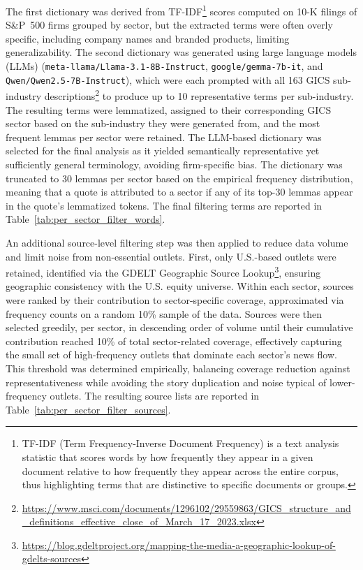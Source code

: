 The first dictionary was derived from TF-IDF\footnote{TF-IDF (Term Frequency-Inverse Document Frequency) is a text analysis statistic that scores words by how frequently they appear in a given document relative to how frequently they appear across the entire corpus, thus highlighting terms that are distinctive to specific documents or groups.} scores computed on 10-K filings of S\&P~500 firms grouped by sector, but the extracted terms were often overly specific, including company names and branded products, limiting generalizability. The second dictionary was generated using large language models (LLMs) (\texttt{meta-llama/Llama-3.1-8B-Instruct}, \texttt{google/gemma-7b-it}, and \texttt{Qwen/Qwen2.5-7B-Instruct}), which were each prompted with all 163 GICS sub-industry descriptions\footnote{\url{https://www.msci.com/documents/1296102/29559863/GICS_structure_and_definitions_effective_close_of_March_17_2023.xlsx}} to produce up to 10 representative terms per sub-industry. The resulting terms were lemmatized, assigned to their corresponding GICS sector based on the sub-industry they were generated from, and the most frequent lemmas per sector were retained. The LLM-based dictionary was selected for the final analysis as it yielded semantically representative yet sufficiently general terminology, avoiding firm-specific bias. The dictionary was truncated to 30 lemmas per sector based on the empirical frequency distribution, meaning that a quote is attributed to a sector if any of its top-30 lemmas appear in the quote's lemmatized tokens. The final filtering terms are reported in Table~\ref{tab:per_sector_filter_words}.

An additional source-level filtering step was then applied to reduce data volume and limit noise from non-essential outlets. First, only U.S.-based outlets were retained, identified via the GDELT Geographic Source Lookup\footnote{\url{https://blog.gdeltproject.org/mapping-the-media-a-geographic-lookup-of-gdelts-sources}}, ensuring geographic consistency with the U.S. equity universe. Within each sector, sources were ranked by their contribution to sector-specific coverage, approximated via frequency counts on a random 10\% sample of the data. Sources were then selected greedily, per sector, in descending order of volume until their cumulative contribution reached 10\% of total sector-related coverage, effectively capturing the small set of high-frequency outlets that dominate each sector's news flow. This threshold was determined empirically, balancing coverage reduction against representativeness while avoiding the story duplication and noise typical of lower-frequency outlets. The resulting source lists are reported in Table~\ref{tab:per_sector_filter_sources}.

